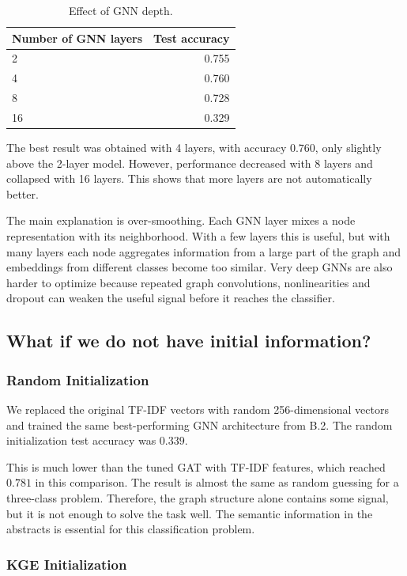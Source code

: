 \documentclass[11pt]{article}
\begin{document}
\begin{table}[H]
\centering
\caption{Effect of GNN depth.}
\begin{tabular}{lr}
\toprule
Number of GNN layers & Test accuracy \\
\midrule
2 & 0.755 \\
4 & 0.760 \\
8 & 0.728 \\
16 & 0.329 \\
\bottomrule
\end{tabular}
\end{table}

The best result was obtained with 4 layers, with accuracy $0.760$, only slightly above the 2-layer model. However, performance decreased with 8 layers and collapsed with 16 layers. This shows that more layers are not automatically better.

The main explanation is over-smoothing. Each GNN layer mixes a node representation with its neighborhood. With a few layers this is useful, but with many layers each node aggregates information from a large part of the graph and embeddings from different classes become too similar. Very deep GNNs are also harder to optimize because repeated graph convolutions, nonlinearities and dropout can weaken the useful signal before it reaches the classifier.

\subsection{What if we do not have initial information?}

\subsubsection{Random Initialization}

We replaced the original TF-IDF vectors with random 256-dimensional vectors and trained the same best-performing GNN architecture from B.2. The random initialization test accuracy was $0.339$.

This is much lower than the tuned GAT with TF-IDF features, which reached $0.781$ in this comparison. The result is almost the same as random guessing for a three-class problem. Therefore, the graph structure alone contains some signal, but it is not enough to solve the task well. The semantic information in the abstracts is essential for this classification problem.

\subsubsection{KGE Initialization}
\end{document}
